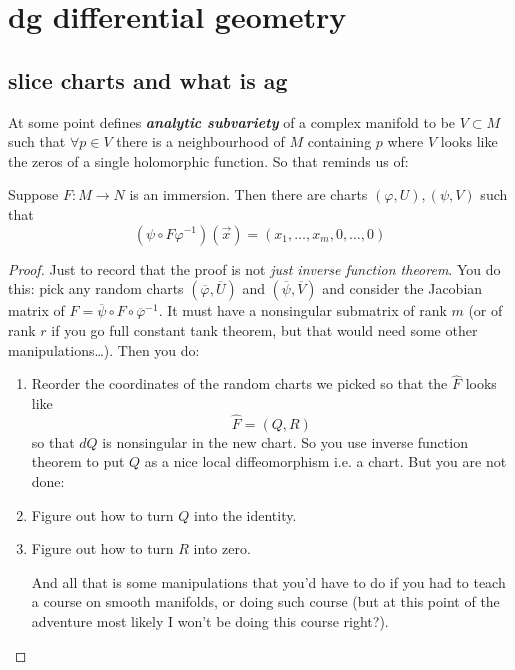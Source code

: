\chapter{dg differential geometry}

\section{slice charts and what is ag}

At some point \cite{gri} defines \textit{\textbf{analytic subvariety}} of a complex manifold to be \(V \subset M\) such that \(\forall p \in V\) there is a neighbourhood of \(M\) containing \(p\) where \(V\) looks like the zeros of a single holomorphic function. So that reminds us of:

\begin{thm}\leavevmode
Suppose \(F:M \to N\) is an immersion. Then there are charts \((\varphi,U),(\psi,V)\) such that
\[(\psi \circ F \varphi^{-1})(\vec{x})=(x_1,\ldots,x_m,0,\ldots,0)\]
\end{thm}

\begin{proof}\leavevmode
Just to record that the proof is not \textit{just inverse function theorem}. You do this: pick any random charts \((\overline{\varphi},\overline{U})\) and \((\overline{\psi},\overline{V})\) and consider the Jacobian matrix of \(\hat{F}=\overline{\psi}\circ F \circ \overline{\varphi}^{-1}\). It must have a nonsingular submatrix of rank \(m\) (or of rank \(r\) if you go full constant tank theorem, but that would need some other manipulations…). Then you do:
\begin{enumerate}
\item Reorder the coordinates of the random charts we picked so that the \(\hat{F}\) looks like
	\[\hat{F}=(Q,R)\]
	so that \(dQ\) is nonsingular in the new chart. So you use inverse function theorem to put \(Q\) as a nice local diffeomorphism i.e. a chart. But you are not done:
 \item Figure out how to turn \(Q\) into the identity.
\item Figure out how to turn \(R\) into zero.

	And all that is some manipulations that you'd have to do if you had to teach a course on smooth manifolds, or doing such course (but at this point of the adventure most likely I won't be doing this course right?).
\end{enumerate}
\end{proof}

